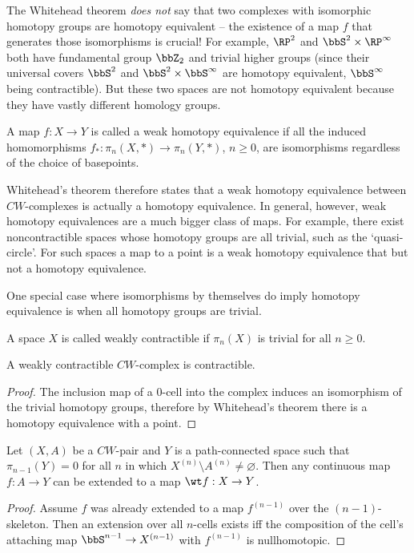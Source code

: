\begin{rem}
    The Whitehead theorem \emph{does not} say that two complexes with isomorphic homotopy groups are homotopy equivalent -- the existence of a map $f$ that generates those isomorphisms is crucial! For example, $\RP^2$ and $\bbS^2\times \RP^\infty$ both have fundamental group $\bbZ_2$ and trivial higher groups (since their universal covers $\bbS^2$ and $\bbS^2\times \bbS^\infty$ are homotopy equivalent,  $\bbS^\infty$ being contractible). But these two spaces are not homotopy equivalent because they have vastly different homology groups.
\end{rem}

\begin{defn}
    A map $f:X\to Y$ is called a weak homotopy equivalence if all the induced homomorphisms $f_\ast:\pi_n(X,*)\to \pi_n(Y,*)$, $n\geq 0$, are isomorphisms regardless of the choice of basepoints.
\end{defn}


Whitehead's theorem therefore states that a weak homotopy equivalence between $CW$-complexes is actually a homotopy equivalence.  In general, however, weak homotopy equivalences are a much bigger class of maps. For example, there exist noncontractible spaces whose homotopy groups are all trivial, such as the `quasi-circle'. For such spaces a map to a point is a weak homotopy equivalence that but not a homotopy equivalence. 

One special case where isomorphisms by themselves do imply homotopy equivalence is when all homotopy groups are trivial.

\begin{defn}
    A space $X$ is called weakly contractible if $\pi_n(X)$ is trivial for all $n\geq 0$.
\end{defn}

\begin{cor}
    A weakly contractible $CW$-complex is contractible.
\end{cor}
\begin{proof}
    The inclusion map of a $0$-cell into the complex induces an isomorphism of the trivial homotopy groups, therefore by Whitehead's theorem there is a homotopy equivalence with a point.
\end{proof}

\begin{lem}\label{lem 4.7 Hatcher}
    Let $(X,A)$ be a $CW$-pair and $Y$ is a path-connected space such that $\pi_{n-1}(Y)=0$ for all $n$ in which $X^{(n)}\setminus A^{(n)}\neq \varnothing$. Then any continuous map $f:A\to Y$ can be extended to a map $\wt f:X\to Y$.
\end{lem}
\begin{proof}
    Assume $f$ was already extended to a map $f^{(n-1)}$ over the $(n-1)$-skeleton. Then an extension over all $n$-cells exists iff the composition of the cell's attaching map $\bbS^{n-1}\to X^{(n-1)}$ with $f^{(n-1)}$ is nullhomotopic.
\end{proof}





